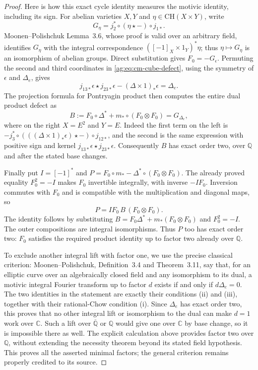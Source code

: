 \begin{proof}
Here is how this exact cycle identity measures the
motivic identity, including its sign.  For abelian
varieties $X,Y$ and $\eta\in\mathrm{CH}(X\times Y)$,
write
\[
 G_\eta=j_2^*\circ(\eta\star-)\circ j_{1*}.
\]
Moonen--Polishchuk Lemma~3.6, whose proof is valid
over an arbitrary field, identifies $G_\eta$ with
the integral correspondence $([-1]_X\times1_Y)^*\eta$;
thus $\eta\mapsto G_\eta$ is an isomorphism of
abelian groups.  Direct substitution gives
$F_0=-G_\epsilon$.  Permuting the second and third
coordinates in \eqref{ag:eq:cm-cube-defect}, using the
symmetry of $\epsilon$ and $\Delta_e$, gives
\[
 j_{13*}\epsilon\star j_{23*}\epsilon
       -(\Delta\times1)_*\epsilon=\Delta_e.
\]
The projection formula for Pontryagin product then
computes the entire dual product defect as
\begin{equation}
 B:=F_0\circ\Delta^*+
       m_*\circ(F_0\otimes F_0)=G_{\Delta_e},       \label{ag:eq:cm-dual-defect}
\end{equation}
where on the right $X=E^2$ and $Y=E$.
Indeed the first term on the left is
$-j_3^*\circ(((\Delta\times1)_*\epsilon)\star-)
\circ j_{12*}$, and the second is the same expression
with positive sign and kernel
$j_{13*}\epsilon\star j_{23*}\epsilon$.
Consequently $B$ has exact order two, over $\mathbb Q$
and after the stated base changes.

Finally put $I=[-1]^*$ and
$P=F_0\circ m_*-\Delta^*\circ(F_0\otimes F_0)$.
The already proved equality $F_0^2=-I$ makes $F_0$
invertible integrally, with inverse $-IF_0$.
Inversion commutes with $F_0$ and is compatible
with the multiplication and diagonal maps, so
\[
 P=I F_0\,B\,(F_0\otimes F_0).
\]
The identity follows by substituting
$B=F_0\Delta^*+m_*(F_0\otimes F_0)$ and
$F_0^2=-I$.  The outer compositions are integral
isomorphisms.  Thus $P$ too has exact order two:
$F_0$ satisfies the required product identity
up to factor two already over $\mathbb Q$.

To exclude another integral lift with factor one,
we use the precise classical criterion:
Moonen--Polishchuk, Definition~3.4 and Theorem~3.11,
say that, for an elliptic curve over an algebraically
closed field and any isomorphism to its dual, a motivic
integral Fourier transform up to factor $d$ exists
if and only if $d\Delta_e=0$.  The two identities
in the statement are exactly their conditions (ii)
and (iii), together with their rational-Chow
condition (i).  Since $\Delta_e$ has exact order two,
this proves that no other integral lift or isomorphism
to the dual can make $d=1$ work over $\mathbb C$.
Such a lift over $\overline{\mathbb Q}$ or $\mathbb Q$
would give one over $\mathbb C$ by base change, so
it is impossible there as well.  The explicit
calculation above provides factor two over $\mathbb Q$,
without extending the necessity theorem beyond its
stated field hypothesis.  This proves all the asserted
minimal factors; the general criterion remains
properly credited to its source.
\end{proof}

